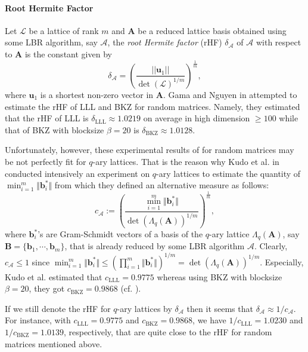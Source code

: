 \documentclass{cta-author}
\begin{document}
\paragraph{Root Hermite Factor}
Let $\mathcal{L}$ be a lattice of rank $m$ and $\mathbf{A}$ be a reduced lattice basis obtained using some LBR algorithm, say $\mathcal{A} $, the \textit{root Hermite factor} (rHF) $\delta_{\mathcal{A}}$ of $\mathcal{A} $ with respect to $\mathbf{A} $ is the constant given by
\begin{equation}\label{keyk}
\delta_{\mathcal{A} }=\left( \frac{||\mathbf{u}_1||}{\det(\mathcal{L})^{1/m}} \right)^{\frac{1}{m}},
\end{equation}
where $\mathbf{u}_1$ is a shortest non-zero vector in $\mathbf{A} $. 
Gama and Nguyen in \cite{GN08} attempted to estimate the rHF of LLL and BKZ for random matrices. Namely, they estimated that the rHF of LLL is $\delta_{\text{LLL}}\approx 1.0219$ on average in high dimension $\geq 100$ while  that of BKZ with blocksize $\beta=20$ is $\delta_{\text{BKZ}}\approx 1.0128$. %

Unfortunately, however, these experimental results of \cite{GN08} for random matrices may be not perfectly fit for $q$-ary lattices. That is the reason why Kudo et al. in \cite{KYGY16} conducted intensively an experiment on $q$-ary lattices to estimate the quantity of $\min_{i=1}^{m}\Vert \mathbf{b}_i^* \Vert$ from which they defined an alternative measure as follows:
\begin{equation}\label{eq1}
c_{\mathcal{A}}:=\left( \frac{\min_{i=1}^{m}\Vert \mathbf{b}_i^* \Vert}{\det(\Lambda_q{(\mathbf{A})})^{1/m}}\right)^{\frac{1}{m}},
\end{equation}
where $\mathbf{b}_i^*$'s are Gram-Schmidt vectors of a basis of the $q$-ary lattice $\Lambda_q{(\mathbf{A})}$, say $\mathbf{B}=\{ \mathbf{b}_1,\cdots,\mathbf{b}_{m}\}$, that is already reduced by some LBR algorithm $\mathcal{A} $. Clearly, $c_{\mathcal{A}} \leq 1$ since $\min_{i=1}^{m}\Vert \mathbf{b}_i^* \Vert \leq (\prod_{i=1}^{m}\Vert \mathbf{b}_i^* \Vert)^{1/m} =\det(\Lambda_q{(\mathbf{A})})^{1/m} $. Especially, Kudo et al. \cite{KYGY16} estimated that
$c_{\text{LLL}}=0.9775$
whereas using BKZ with blocksize $\beta=20$, they got 
$c_{\text{BKZ}}=0.9868$ (cf. \cite[Table 1]{KYGY16}).

If we still denote the rHF for $q$-ary lattices by $\delta_{\mathcal{A}}$ then it seems that $\delta_{\mathcal{A}} \approx 1/c_{\mathcal{A}}$. For instance, with $c_{\text{LLL}}=0.9775$ and $c_{\text{BKZ}}=0.9868$, we have $1/c_{\text{LLL}}=1.0230$ and $1/c_{\text{BKZ}}=1.0139$, respectively, that are quite close to the rHF for random matrices mentioned above.
\end{document}
